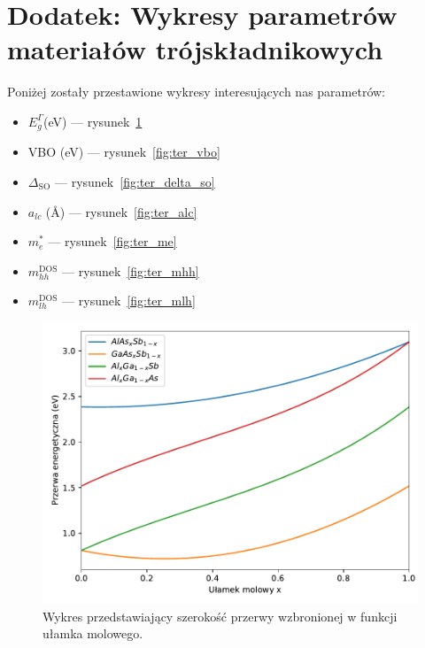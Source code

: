 \documentclass[12pt,openany,a4paper]{book}
\begin{document}
\chapter*{Dodatek: Wykresy parametrów materiałów trójskładnikowych}\label{chapt:dodatek}
Poniżej zostały przestawione wykresy interesujących nas parametrów:
\begin{itemize}
	\item \(E_g^{\Gamma}\)(eV) --- rysunek~\ref{fig:ter_Eg}
	\item VBO (eV) --- rysunek~\ref{fig:ter_vbo} 
	\item \(\Delta_{\textrm{SO}}\) --- rysunek~\ref{fig:ter_delta_so}
	\item \(a_{lc}\) (\AA) --- rysunek~\ref{fig:ter_alc}
	\item \(m_e^{\ast}\) --- rysunek~\ref{fig:ter_me}
	\item \(m_{hh}^{\textrm{DOS}}\) --- rysunek~\ref{fig:ter_mhh}
	\item \(m_{lh}^{\textrm{DOS}}\) --- rysunek~\ref{fig:ter_mlh}
\end{itemize}
\begin{figure}[H]
	\centering
	\includegraphics[width = 0.9\linewidth]{Figures/ternary/eg.pdf}
	\caption{Wykres przedstawiający szerokość przerwy wzbronionej w funkcji ułamka 
	molowego.}\label{fig:ter_Eg}
\end{figure}
\end{document}
